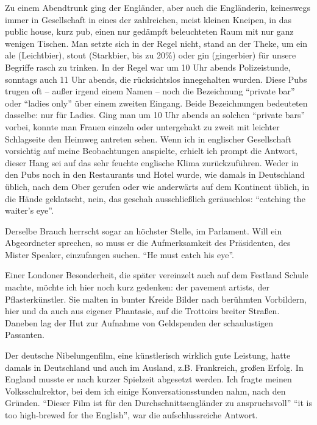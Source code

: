 Zu einem Abendtrunk ging der Engländer, aber auch die Engländerin, keineswegs immer in Gesellschaft in eines der zahlreichen, meist kleinen Kneipen, in das public house, kurz pub, einen nur gedämpft beleuchteten Raum mit nur ganz wenigen Tischen. Man setzte sich in der Regel nicht, stand an der Theke, um ein ale (Leichtbier), stout (Starkbier, bis zu 20\%) oder gin (gingerbier) für unsere Begriffe rasch zu trinken. In der Regel war um 10 Uhr abends Polizeistunde, sonntags auch 11 Uhr abends, die rücksichtslos innegehalten wurden. Diese Pubs trugen oft -- außer irgend einem Namen -- noch die Bezeichnung \enquote{private bar} oder \enquote{ladies only} über einem zweiten Eingang. Beide Bezeichnungen bedeuteten dasselbe: nur für Ladies. Ging man um 10 Uhr abends an solchen \enquote{private bars} vorbei, konnte man Frauen einzeln oder untergehakt zu zweit mit leichter Schlagseite den Heimweg antreten sehen. Wenn ich in englischer Gesellschaft vorsichtig auf meine Beobachtungen anspielte, erhielt ich prompt die Antwort, dieser Hang sei auf das sehr feuchte englische Klima zurückzuführen. Weder in den Pubs noch in den Restaurants und Hotel wurde, wie damals in Deutschland üblich, nach dem Ober gerufen oder wie anderwärts auf dem Kontinent üblich, in die Hände geklatscht, nein, das geschah ausschließlich geräuschlos: \enquote{catching the waiter's eye}.

Derselbe Brauch herrscht sogar an höchster Stelle, im Parlament. Will ein Abgeordneter sprechen, so muss er die Aufmerksamkeit des Präsidenten, des Mister Speaker, einzufangen suchen. \enquote{He must catch his eye}.

Einer Londoner Besonderheit, die später vereinzelt auch auf dem Festland Schule machte, möchte ich hier noch kurz gedenken: der pavement artists, der Pflasterkünstler. Sie malten in bunter Kreide Bilder nach berühmten Vorbildern, hier und da auch aus eigener Phantasie, auf die Trottoirs breiter Straßen. Daneben lag der Hut zur Aufnahme von Geldspenden der schaulustigen Passanten.

Der deutsche Nibelungenfilm, eine künstlerisch wirklich gute Leistung, hatte damals in Deutschland und auch im Ausland, z.B. Frankreich, großen Erfolg. In England musste er nach kurzer Spielzeit abgesetzt werden. Ich fragte meinen Volksschulrektor, bei dem ich einige Konversationsstunden nahm, nach den Gründen. \enquote{Dieser Film ist für den Durchschnittsengländer zu anspruchsvoll} \enquote{it is too high-brewed for the English}, war die aufschlussreiche Antwort.\\

